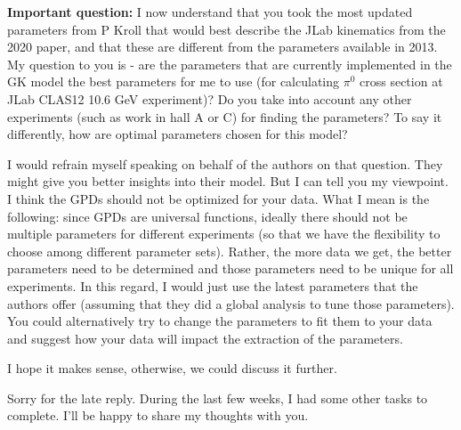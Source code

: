     

    \iffalse
    
    \textbf{Important question:} I now understand that you took the most updated parameters from P Kroll that would best describe the JLab kinematics from the 2020 paper, and that these are different from the parameters available in 2013. My question to you is - are the parameters that are currently implemented in the GK model the best parameters for me to use (for calculating $\pi^0$ cross section at JLab CLAS12 10.6 GeV experiment)? Do you take into account any other experiments (such as work in hall A or C) for finding the parameters? To say it differently, how are optimal parameters chosen for this model?
    
    I would refrain myself speaking on behalf of the authors on that question. They might give you better insights into their model. But I can tell you my viewpoint. I think the GPDs should not be optimized for your data. What I mean is the following: since GPDs are universal functions, ideally there should not be multiple parameters for different experiments (so that we have the flexibility to choose among different parameter sets). Rather, the more data we get, the better parameters need to be determined and those parameters need to be unique for all experiments. In this regard, I would just use the latest parameters that the authors offer (assuming that they did a global analysis to tune those parameters). You could alternatively try to change the parameters to fit them to your data and suggest how your data will impact the extraction of the parameters.
    
    I hope it makes sense, otherwise, we could discuss it further.
    
    Sorry for the late reply. During the last few weeks, I had some other tasks to complete. I'll be happy to share my thoughts with you.
    
